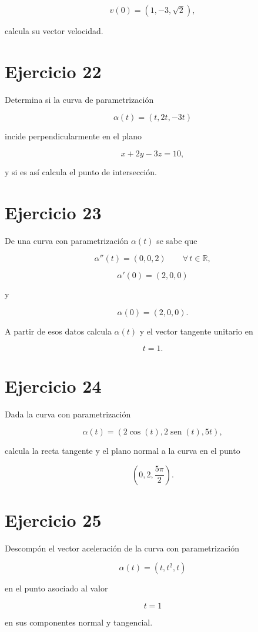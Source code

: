 \documentclass[11pt,a4paper]{article}
\newcommand{\R}{\mathbb{R}}
\newcommand{\sen}{\operatorname{sen}}
\begin{document}
\[
v(0)
=
(1,-3,\sqrt2),
\]

calcula su vector velocidad.

\section{Ejercicio 22}

Determina si la curva de parametrización

\[
\alpha(t)
=
(t,2t,-3t)
\]

incide perpendicularmente en el plano

\[
x+2y-3z=10,
\]

y si es así calcula el punto de intersección.

\section{Ejercicio 23}

De una curva con parametrización \(\alpha(t)\) se sabe que

\[
\alpha''(t)
=
(0,0,2)
\qquad
\forall\,t\in\R,
\]

\[
\alpha'(0)
=
(2,0,0)
\]

y

\[
\alpha(0)
=
(2,0,0).
\]

A partir de esos datos calcula \(\alpha(t)\) y el vector tangente unitario en

\[
t=1.
\]

\section{Ejercicio 24}

Dada la curva con parametrización

\[
\alpha(t)
=
(2\cos(t),2\sen(t),5t),
\]

calcula la recta tangente y el plano normal a la curva en el punto

\[
\left(
0,2,\frac{5\pi}{2}
\right).
\]

\section{Ejercicio 25}

Descompón el vector aceleración de la curva con parametrización

\[
\alpha(t)
=
(t,t^2,t)
\]

en el punto asociado al valor

\[
t=1
\]

en sus componentes normal y tangencial.
\end{document}
